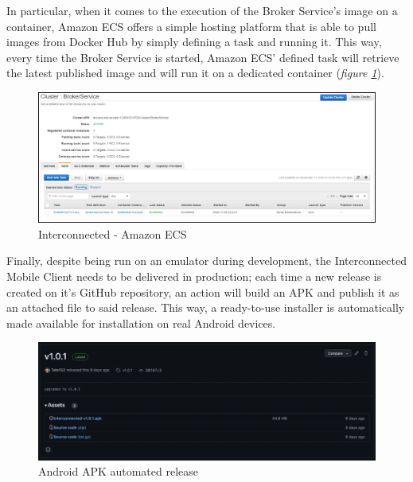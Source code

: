 In particular, when it comes to the execution of the Broker Service's image on a container, Amazon ECS offers a simple hosting platform that is able to pull images from Docker Hub by simply defining a task and running it. This way, every time the Broker Service is started, Amazon ECS' defined task will retrieve the latest published image and will run it on a dedicated container (\textit{figure \ref{fig:interconnected_ecs}}).

\begin{figure}[!ht]
    \centering
    \includegraphics[scale=0.4]{document/chapters/chapter_7/images/interconnected_ecs.png}
    \caption{Interconnected - Amazon ECS}
    \label{fig:interconnected_ecs}
\end{figure}

Finally, despite being run on an emulator during development, the Interconnected Mobile Client needs to be delivered in production; each time a new release is created on it's GitHub repository, an action will build an APK and publish it as an attached file to said release. This way, a ready-to-use installer is automatically made available for installation on real Android devices.

\begin{figure}[!ht]
    \centering
    \includegraphics[scale=0.32]{document/chapters/chapter_7/images/github_actions_apk.png}
    \caption{Android APK automated release}
    \label{fig:github_actions_apk}
\end{figure}